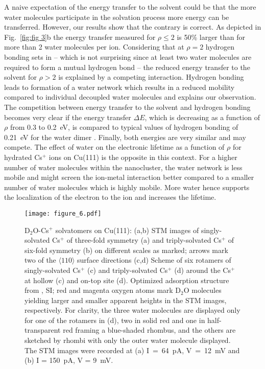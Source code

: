 \documentclass[aps,twocolumn,amssymb,amsfonts,amsmath,showpacs,final,a4paper,superscriptaddress]{revtex4-2}
\begin{document}
A naive expectation of the energy transfer to the solvent could be that the more water molecules participate in the solvation process more energy can be transferred. However, our results show that the contrary is correct. As depicted in Fig.~\ref{fig:fig 3}b the energy transfer measured for $\rho \le 2$ is 50\% larger than for more than 2 water molecules per ion. Considering that at $\rho=2$ hydrogen bonding sets in --  which is not surprising since at least two water molecules are required to form a mutual hydrogen bond --  the reduced energy transfer to the solvent for $\rho>2$ is explained by a competing interaction. Hydrogen bonding leads to formation of a water network which results in a reduced mobility compared to individual decoupled water molecules and explains our observation. The competition between energy transfer to the solvent and hydrogen bonding becomes very clear if the energy transfer $\Delta E$, which is decreasing as a function of $\rho$ from 0.3 to 0.2~eV, is compared to typical values of hydrogen bonding of 0.21~eV for the water dimer \cite{xantheas_dunning_1993}. Finally, both energies are very similar and may compete. The effect of water on the electronic lifetime as a function of $\rho$ for hydrated Cs$^+$ ions on Cu(111) is the opposite in this context. For a higher number of water molecules within the nanocluster, the water network is less mobile and might screen the ion-metal interaction better compared to a smaller number of water molecules which is highly mobile. More water hence supports the localization of the electron to the ion and increases the lifetime.


\begin{figure}[t]
    \centering
    \texttt{[image: figure\_6.pdf]}
    \caption{D$_2$O-Cs$^+$ solvatomers on Cu(111): (a,b) STM images of singly-solvated Cs$^+$ of three-fold symmetry (a) and triply-solvated Cs$^+$ of six-fold symmetry (b) on different scales as marked; arrows mark two of the $\langle 110 \rangle$ surface directions (c,d) Scheme of six rotamers of singly-solvated Cs$^+$ (c) and triply-solvated Cs$^+$ (d) around the Cs$^+$ at hollow (c) and on-top site (d). Optimized adsorption structure from \cite{penschke_2023}, SI; red and magenta oxygen atoms mark D$_2$O molecules yielding larger and smaller apparent heights in the STM images, respectively. For clarity, the three water molecules are displayed only for one of the rotamers in (d), two in solid red and one in half-transparent red framing a blue-shaded rhombus, and the others are sketched by rhombi with only the outer water molecule displayed. The STM images were recorded at (a) I~=~64~pA, V~=~12~mV and (b) I = 150~pA,  V = 9~mV.} %
    \label{fig:fig 6}
\end{figure}
\end{document}

